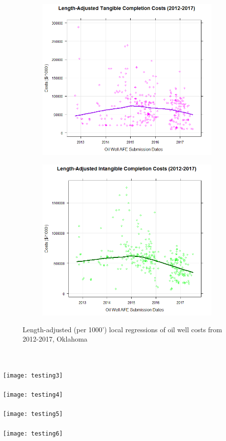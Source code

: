 \documentclass{article}
\begin{document}
\begin{enumerate}
\begin{figure}[h]
\begin{subfigure}{.5\textwidth}
  \label{fig:sub2}
\end{subfigure}
\label{fig:test}
\end{figure}
\\\\
\begin{figure}[h]
\centering
\begin{subfigure}{.5\textwidth}
  \centering
  \includegraphics[width=.8\linewidth]{LengthTangibleComp}
  \label{fig:sub1}
\end{subfigure}%
\begin{subfigure}{.5\textwidth}
  \centering
  \includegraphics[width=.8\linewidth]{LengthIntangibleComp}
  \label{fig:sub2}
\end{subfigure}
\caption{Length-adjusted (per 1000') local regressions of oil well costs from 2012-2017, Oklahoma}
\label{fig:test}
\end{figure}
\\\\
\texttt{[image: testing3]}
\\\\
\texttt{[image: testing4]}
\\\\
\texttt{[image: testing5]}
\\\\
\texttt{[image: testing6]}
\\\\
\end{enumerate}
\end{document}
